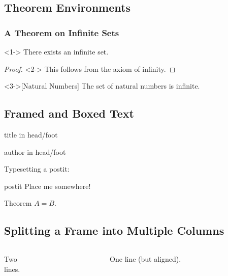 \subsection{Theorem Environments}
\begin{frame}
  \frametitle{A Theorem on Infinite Sets}
  \begin{theorem}<1->
    There exists an infinite set.
  \end{theorem}
  \begin{proof}<2->
    This follows from the axiom of infinity.
  \end{proof}
  \begin{example}<3->[Natural Numbers]
    The set of natural numbers is infinite.
  \end{example}
\end{frame}
\subsection{Framed and Boxed Text}
\begin{frame}
	\begin{beamercolorbox}[ht=2.5ex,dp=1ex,center]{title in head/foot}
  		\insertshorttitle
	\end{beamercolorbox}%
	\begin{beamercolorbox}[ht=2.5ex,dp=1ex,center]{author in head/foot}
  		\insertshortauthor
	\end{beamercolorbox}
	\mbox{}\medskip\newline
	Typesetting a postit:\newline
	\begin{beamercolorbox}[sep=1em,wd=5cm]{postit}
  		Place me somewhere!
	\end{beamercolorbox}
	\mbox{}\medskip\newline
	\begin{beamerboxesrounded}[upper=block head,lower=block body,shadow=true]{Theorem}
  		$A = B$.
	\end{beamerboxesrounded}
\end{frame}
\subsection{Splitting a Frame into Multiple Columns}
\begin{frame}
	\begin{columns}[t]
  		\begin{column}{5cm}
    		Two\\lines.
  		\end{column}
  		\begin{column}{5cm}
    		One line (but aligned).
  		\end{column}
	\end{columns}
\end{frame}
